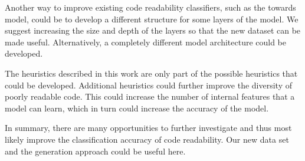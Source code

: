 \documentclass[%
class=scrreprt,
chapterprefix=false,%
open=right,%
twoside=false,%
paper=a4,%
logofile={Logo\_zentral\_farbig\_EN.png},%
thesistype=master,%
UKenglish,%
]{se2thesis}
\theoremstyle{definition}
\begin{document}
	Another way to improve existing code readability classifiers, such as the towards model, could be to develop a different structure for some layers of the model. We suggest increasing the size and depth of the layers so that the new dataset can be made useful. Alternatively, a completely different model architecture could be developed. 
	
	The heuristics described in this work are only part of the possible heuristics that could be developed. Additional heuristics could further improve the diversity of poorly readable code. This could increase the number of internal features that a model can learn, which in turn could increase the accuracy of the model.
	
	In summary, there are many opportunities to further investigate and thus most likely improve the classification accuracy of code readability. Our new data set and the generation approach could be useful here.
	
	\backmatter
	
	\printbibliography
	
\end{document}
